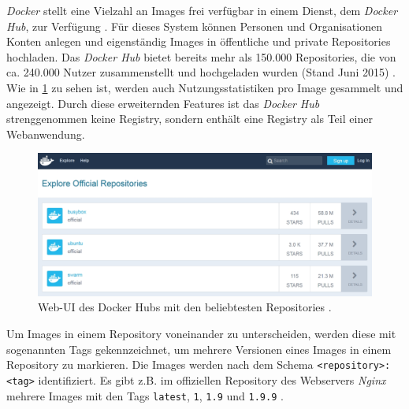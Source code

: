 \documentclass[../main.tex]{subfiles}
\begin{document}
      \emph{Docker} stellt eine Vielzahl an Images frei verfügbar in einem Dienst, dem \emph{Docker Hub}, zur Verfügung \cite[S.11]{dockerBook}\cite[S.3]{dockerSec1}\cite{dockerRegistry}. Für dieses System können Personen und Organisationen Konten anlegen und eigenständig Images in öffentliche und private Repositories hochladen. Das \emph{Docker Hub} bietet bereits mehr als 150.000 Repositories, die von ca. 240.000 Nutzer zusammenstellt und hochgeladen wurden (Stand Juni 2015) \cite[S.16]{slideshareDockercon15}. Wie in \fig \ref{fig:intro_registry} zu sehen ist, werden auch Nutzungsstatistiken pro Image gesammelt und angezeigt. Durch diese erweiternden Features ist das \emph{Docker Hub} strenggenommen keine Registry, sondern enthält eine Registry als Teil einer Webanwendung. %

      \begin{figure}[h]
          \centering
          \includegraphics[width=1.0\textwidth]{./images/intro_registry.jpg}
          \caption{Web-\acrshort{UI} des Docker Hubs mit den beliebtesten Repositories \cite{dockerHub}.}
          \label{fig:intro_registry}
      \end{figure}

			Um Images in einem Repository voneinander zu unterscheiden, werden diese mit sogenannten Tags gekennzeichnet, um mehrere Versionen eines Images in einem Repository zu markieren. Die Images werden nach dem Schema \texttt{<repository>:<tag>} identifiziert. Es gibt z.B. im offiziellen Repository des Webservers \emph{Nginx} mehrere Images mit den Tags \texttt{latest}, \texttt{1}, \texttt{1.9} und \texttt{1.9.9} \cite{dockerHubNginx}.




\end{document}
